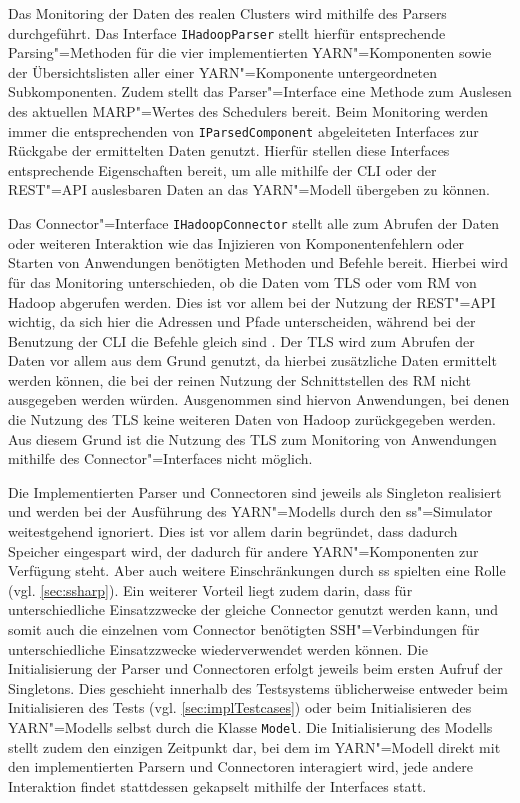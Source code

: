 Das Monitoring der Daten des realen Clusters wird mithilfe des Parsers durchgeführt.
Das Interface \texttt{IHadoopParser} stellt hierfür entsprechende Parsing"=Methoden für die vier implementierten YARN"=Komponenten sowie der Übersichtslisten aller einer YARN"=Komponente untergeordneten Subkomponenten.
Zudem stellt das Parser"=Interface eine Methode zum Auslesen des aktuellen \gls{MARP}"=Wertes des Schedulers bereit.
Beim Monitoring werden immer die entsprechenden von \texttt{IParsedComponent} abgeleiteten Interfaces zur Rückgabe der ermittelten Daten genutzt.
Hierfür stellen diese Interfaces entsprechende Eigenschaften bereit, um alle mithilfe der \gls{CLI} oder der REST"=API auslesbaren Daten an das YARN"=Modell übergeben zu können.

Das Connector"=Interface \texttt{IHadoopConnector} stellt alle zum Abrufen der Daten oder weiteren Interaktion wie das Injizieren von Komponentenfehlern oder Starten von Anwendungen benötigten Methoden und Befehle bereit.
Hierbei wird für das Monitoring unterschieden, ob die Daten vom \gls{TLS} oder vom \gls{RM} von Hadoop abgerufen werden.
Dies ist vor allem bei der Nutzung der REST"=API wichtig, da sich hier die Adressen und Pfade unterscheiden, während bei der Benutzung der \gls{CLI} die Befehle gleich sind .
Der \gls{TLS} wird zum Abrufen der Daten vor allem aus dem Grund genutzt, da hierbei zusätzliche Daten ermittelt werden können, die bei der reinen Nutzung der Schnittstellen des \gls{RM} nicht ausgegeben werden würden.
Ausgenommen sind hiervon Anwendungen, bei denen die Nutzung des \gls{TLS} keine weiteren Daten von Hadoop zurückgegeben werden\cite{HadoopYarnTlServer271,HadoopYarnCmds271,HadoopRmApi271,HadoopNmApi271}.
Aus diesem Grund ist die Nutzung des \gls{TLS} zum Monitoring von Anwendungen mithilfe des Connector"=Interfaces nicht möglich.

Die Implementierten Parser und Connectoren sind jeweils als Singleton realisiert und werden bei der Ausführung des YARN"=Modells durch den \gls{ss}"=Simulator weitestgehend ignoriert.
Dies ist vor allem darin begründet, dass dadurch Speicher eingespart wird, der dadurch für andere YARN"=Komponenten zur Verfügung steht.
Aber auch weitere Einschränkungen durch \gls{ss} spielten eine Rolle (vgl. \cref{sec:ssharp}).
Ein weiterer Vorteil liegt zudem darin, dass für unterschiedliche Einsatzzwecke der gleiche Connector genutzt werden kann, und somit auch die einzelnen vom Connector benötigten SSH"=Verbindungen für unterschiedliche Einsatzzwecke wiederverwendet werden können.
Die Initialisierung der Parser und Connectoren erfolgt jeweils beim ersten Aufruf der Singletons.
Dies geschieht innerhalb des Testsystems üblicherweise entweder beim Initialisieren des Tests (vgl. \cref{sec:implTestcases}) oder beim Initialisieren des YARN"=Modells selbst durch die Klasse \texttt{Model}.
Die Initialisierung des Modells stellt zudem den einzigen Zeitpunkt dar, bei dem im YARN"=Modell direkt mit den implementierten Parsern und Connectoren interagiert wird, jede andere Interaktion findet stattdessen gekapselt mithilfe der Interfaces statt.

